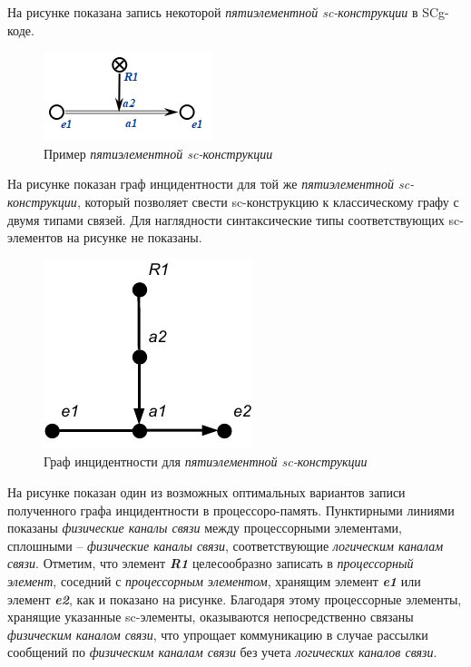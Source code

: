 На рисунке \textit{} показана запись некоторой \textit{пятиэлементной sc-конструкции} в SCg-коде.

\begin{figure}[H]
	\includegraphics[scale=0.8]{images/part6/chapter_computer/computer graph1.png}
	\caption{Пример \textit{пятиэлементной sc-конструкции}}
	\label{fig:computer-graph1}
\end{figure}

На рисунке \textit{} показан граф инцидентности для той же \textit{пятиэлементной sc-конструкции}, который позволяет свести sc-конструкцию к классическому графу с двумя типами связей. Для наглядности синтаксические типы соответствующих sc-элементов на рисунке не показаны.

\begin{figure}[H]
	\includegraphics[scale=1]{images/part6/chapter_computer/incidence example.pdf}
	\caption{Граф инцидентности для \textit{пятиэлементной sc-конструкции}}
	\label{fig:incidence-example}
\end{figure}

На рисунке \textit{} показан один из возможных оптимальных вариантов записи полученного графа инцидентности в процессоро-память. Пунктирными линиями показаны \textit{физические каналы связи} между процессорными элементами, сплошными -- \textit{физические каналы связи}, соответствующие \textit{логическим каналам связи}. Отметим, что элемент \textbf{\textit{R1}} целесообразно записать в \textit{процессорный элемент}, соседний с \textit{процессорным элементом}, хранящим элемент \textbf{\textit{e1}} или элемент \textbf{\textit{e2}}, как и показано на рисунке. Благодаря этому процессорные элементы, хранящие указанные sc-элементы, оказываются непосредственно связаны \textit{физическим каналом связи}, что упрощает коммуникацию в случае рассылки сообщений по \textit{физическим каналам связи} без учета \textit{логических каналов связи}.

